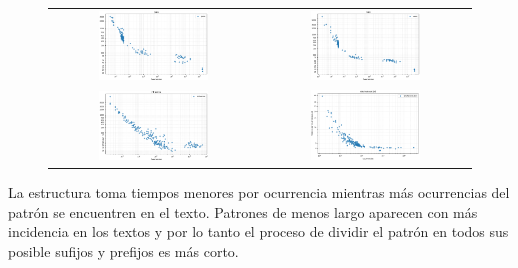 \begin{figure}
\begin{tabular}{cc}
        \includegraphics[width=0.55\textwidth]{imagenes/SEARCH_para.png} & \includegraphics[width=0.55\textwidth]{imagenes/SEARCH_cere.png} \\
        \includegraphics[width=0.55\textwidth]{imagenes/SEARCH_influenza.png} & \includegraphics[width=0.55\textwidth]{imagenes/SEARCH_einstein.png} \\
    \end{tabular}    
    \label{fig:searchpizza}
\end{figure}

La estructura toma tiempos menores por ocurrencia mientras más ocurrencias del patrón se encuentren en el texto. Patrones de menos largo aparecen con más incidencia en los textos y por lo tanto el proceso de dividir el patrón en todos sus posible sufijos y prefijos es más corto. 

